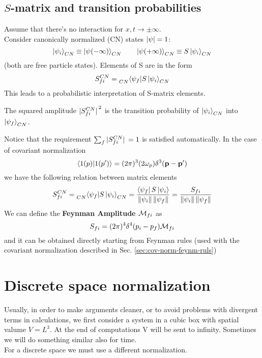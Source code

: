 \documentclass[TheoreticalPhy_ModB.tex]{subfiles}
\begin{document}
\subsection{$S$-matrix and transition probabilities}
Assume that there's no interaction for $x, t \to \pm\infty$.\\
Consider canonically normalized (CN) states $\abs{\psi} = 1$:
\[
\ket{\psi_i}_{CN} \equiv \ket{\psi(-\infty)}_{CN}
\qquad
\ket{\psi(+\infty)}_{CN} \equiv S \ket{\psi_i}_{CN}
\]
(both are free particle states).
Elements of S are in the form
\[
S_{fi}^{CN} = \prescript{}{CN}{\bra{\psi_f}} S \ket{ \psi_i}_{CN}
\]
This leads to a probabilistic interpretation of S-matrix elements. 
\begin{mdframed}[style=mybox]
The squared amplitude $\abs*{S_{fi}^{CN}}^2$ is the transition probability of $\ket{\psi_i}_{CN}$ into $\ket{\psi_f}_{CN}$. 
\end{mdframed}
Notice that the requirement $\sum_f \abs*{S_{fi}^{CN}} = 1$ is satisfied automatically.
In the case of covariant normalization
\[
\braket{1(p)}{1(p')} = (2 \pi)^3 (2 \omega _p)\delta^3 (\mathbf{p} - \mathbf{p}')
\]
we have the following relation between matrix elements
\[
S_{fi}^{CN} = \prescript{}{CN}{\bra{\psi_f}} S \ket{\psi_i}_{CN} = \frac{\bra{\psi_f} S \ket{ \psi_i}}{\left\lVert \psi_i \right\rVert \left\lVert \psi_f \right\rVert} = \frac{S_{fi}}{\left\lVert \psi_i \right\rVert \left\lVert \psi_f \right\rVert}
\]
We can define the \textbf{Feynman Amplitude $\mathcal{M}_{fi}$} as
\[
S_{fi} = (2 \pi)^4 \delta^4 (p_i - p_f) \mathcal{M}_{fi}
\]
and it can be obtained directly starting from Feynman rules (used with the covariant normalization described in Sec. \ref{sec:cov-norm-feynm-ruls})

\section{Discrete space normalization}
Usually, in order to make arguments cleaner, or to avoid problems with divergent terms in calculations, we first consider a system in a cubic box with spatial valume $V = L^3$.
At the end of computations V will be sent to infinity. Sometimes we will do something similar also for time.\\
For a discrete space we must use a different normalization.
\end{document}
